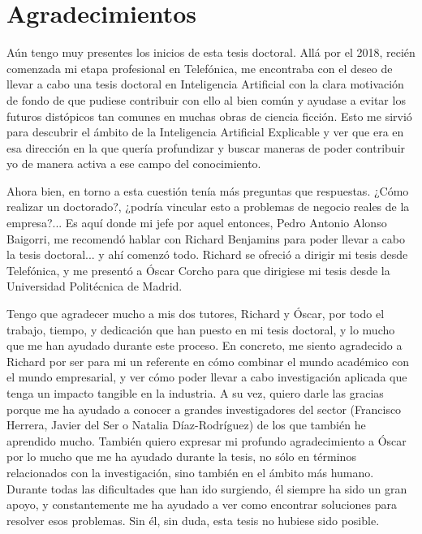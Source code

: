 \vspace*{15em}

\chapter*{Agradecimientos}

Aún tengo muy presentes los inicios de esta tesis doctoral. Allá por el 2018, recién comenzada mi etapa profesional en Telefónica, me encontraba con el deseo de llevar a cabo una tesis doctoral en Inteligencia Artificial con la clara motivación de fondo de que pudiese contribuir con ello al bien común y ayudase a evitar los futuros distópicos tan comunes en muchas obras de ciencia ficción. Esto me sirvió para descubrir el ámbito de la Inteligencia Artificial Explicable y ver que era en esa dirección en la que quería profundizar y buscar maneras de poder contribuir yo de manera activa a ese campo del conocimiento. 

Ahora bien, en torno a esta cuestión tenía más preguntas que respuestas. ¿Cómo realizar un doctorado?, ¿podría vincular esto a problemas de negocio reales de la empresa?... Es aquí donde mi jefe por aquel entonces, Pedro Antonio Alonso Baigorri, me recomendó hablar con Richard Benjamins para poder llevar a cabo la tesis doctoral... y ahí comenzó todo. Richard se ofreció a dirigir mi tesis desde Telefónica, y me presentó a Óscar Corcho para que dirigiese mi tesis desde la Universidad Politécnica de Madrid.

Tengo que agradecer mucho a mis dos tutores, Richard y Óscar, por todo el trabajo, tiempo, y dedicación que han puesto en mi tesis doctoral, y lo mucho que me han ayudado durante este proceso. En concreto, me siento agradecido a Richard por ser para mi un referente en cómo combinar el mundo académico con el mundo empresarial, y ver cómo poder llevar a cabo investigación aplicada que tenga un impacto tangible en la industria. A su vez, quiero darle las gracias porque me ha ayudado a conocer a grandes investigadores del sector (Francisco Herrera, Javier del Ser o Natalia Díaz-Rodríguez) de los que también he aprendido mucho. También quiero expresar mi profundo agradecimiento a Óscar por lo mucho que me ha ayudado durante la tesis, no sólo en términos relacionados con la investigación, sino también en el ámbito más humano. Durante todas las dificultades que han ido surgiendo, él siempre ha sido un gran apoyo, y constantemente me ha ayudado a ver como encontrar soluciones para resolver esos problemas. Sin él, sin duda, esta tesis no hubiese sido posible. 

